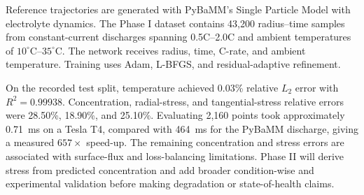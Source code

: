 \documentclass[14pt,a4paper,oneside]{extreport}
\begin{document}
Reference trajectories are generated with PyBaMM's Single Particle Model with electrolyte dynamics. The Phase I dataset contains 43,200 radius--time samples from constant-current discharges spanning 0.5C--2.0C and ambient temperatures of $10^{\circ}$C--$35^{\circ}$C. The network receives radius, time, C-rate, and ambient temperature. Training uses Adam, L-BFGS, and residual-adaptive refinement.

On the recorded test split, temperature achieved 0.03\% relative $L_2$ error with $R^2=0.99938$. Concentration, radial-stress, and tangential-stress relative errors were 28.50\%, 18.90\%, and 25.10\%. Evaluating 2,160 points took approximately 0.71~ms on a Tesla T4, compared with 464~ms for the PyBaMM discharge, giving a measured $657\times$ speed-up. The remaining concentration and stress errors are associated with surface-flux and loss-balancing limitations. Phase II will derive stress from predicted concentration and add broader condition-wise and experimental validation before making degradation or state-of-health claims.

\clearpage
\begingroup
{}
\tableofcontents
\endgroup
\clearpage
\listoftables
{}
\clearpage
\listoffigures
{}
\clearpage
\end{document}
